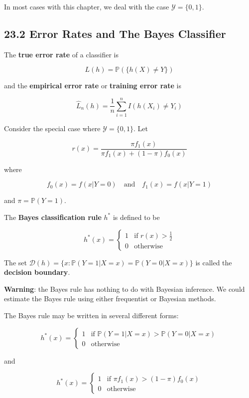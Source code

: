 In most cases with this chapter, we deal with the case
\(\mathcal{Y} = \{ 0, 1 \}\).

\subsection*{23.2 Error Rates and The Bayes Classifier}\label{error-rates-and-the-bayes-classifier}

The \textbf{true error rate} of a classifier is

\[ L(h) = \mathbb{P}( \{ h(X) \neq Y\} ) \]

and the \textbf{empirical error rate} or \textbf{training error rate} is

\[ \hat{L}_{n}(h) = \frac{1}{n} \sum_{i=1}^{n} I(h(X_{i}) \neq Y_{i}) \]

Consider the special case where \(\mathcal{Y} = \{0, 1\}\). Let

\[ r(x) = \frac{\pi f_{1}(x)}{\pi f_{1}(x) + (1 - \pi) f_{0}(x)} \]

where

\[ f_{0}(x) = f(x | Y = 0)
\quad \text{and} \quad
f_{1}(x) = f(x | Y = 1)\]

and \(\pi = \mathbb{P}(Y = 1)\).

The \textbf{Bayes classification rule} \(h^*\) is defined to be

\[
h^*(x) = \begin{cases}
1 & \text{if } r(x) > \frac{1}{2} \\
0 & \text{otherwise}
\end{cases}
\]

The set
\(\mathcal{D}(h) = \{ x : \mathbb{P}(Y = 1 | X = x) = \mathbb{P}(Y = 0 | X = x) \}\)
is called the \textbf{decision boundary}.

\textbf{Warning}: the Bayes rule has nothing to do with Bayesian
inference. We could estimate the Bayes rule using either frequentist or
Bayesian methods.

The Bayes rule may be written in several different forms:

\[
h^*(x) = \begin{cases}
1 & \text{if } \mathbb{P}(Y = 1 | X = x) > \mathbb{P}(Y = 0 | X  = x)\\
0 & \text{otherwise}
\end{cases}
\]

and

\[
h^*(x) = \begin{cases}
1 & \text{if } \pi f_{1}(x) > (1 - \pi) f_{0}(x) \\
0 & \text{otherwise}
\end{cases}
\]

